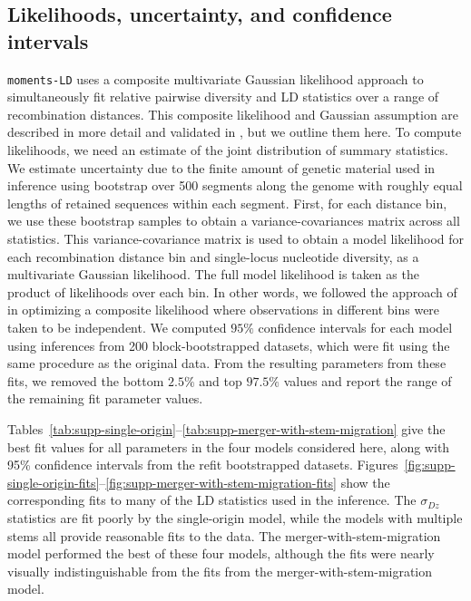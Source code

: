 \documentclass[]{article}
\begin{document}
\subsection{Likelihoods, uncertainty, and confidence intervals}
\label{sec:likelihoods-uncertainty}

\texttt{moments-LD} uses a composite multivariate Gaussian likelihood approach
to simultaneously fit relative pairwise diversity and LD statistics over a
range of recombination distances. This composite likelihood and Gaussian
assumption are described in more detail and validated in
\citet{Ragsdale2019-nt}, but we outline them here. To compute likelihoods, we
need an estimate of the joint distribution of summary statistics. We estimate
uncertainty due to the finite amount of genetic material used in inference
using bootstrap over 500 segments along the genome with roughly equal lengths
of retained sequences within each segment. First, for each distance bin, we use
these bootstrap samples to obtain a variance-covariances matrix across all
statistics. This variance-covariance matrix is used to obtain a model
likelihood for each recombination distance bin and single-locus nucleotide
diversity, as a multivariate Gaussian likelihood. The full model likelihood is
taken as the product of likelihoods over each bin. In other words, we followed
the approach of \citet{Ragsdale2019-nt} in optimizing a composite likelihood
where observations in different bins were taken to be independent. We computed
$95\%$ confidence intervals for each model using inferences from 200
block-bootstrapped datasets, which were fit using the same procedure as the
original data. From the resulting parameters from these fits, we removed the
bottom $2.5\%$ and top $97.5\%$ values and report the range of the remaining
fit parameter values.

Tables~\ref{tab:supp-single-origin}--\ref{tab:supp-merger-with-stem-migration}
give the best fit values for all parameters in the four models considered here,
along with 95\% confidence intervals from the refit bootstrapped datasets.
Figures~\ref{fig:supp-single-origin-fits}--\ref{fig:supp-merger-with-stem-migration-fits}
show the corresponding fits to many of the LD statistics used in the inference.
The $\sigma_{Dz}$ statistics are fit poorly by the single-origin model, while
the models with multiple stems all provide reasonable fits to the data. The
merger-with-stem-migration model performed the best of these four models,
although the fits were nearly visually indistinguishable from the fits from the
merger-with-stem-migration model.
\end{document}

